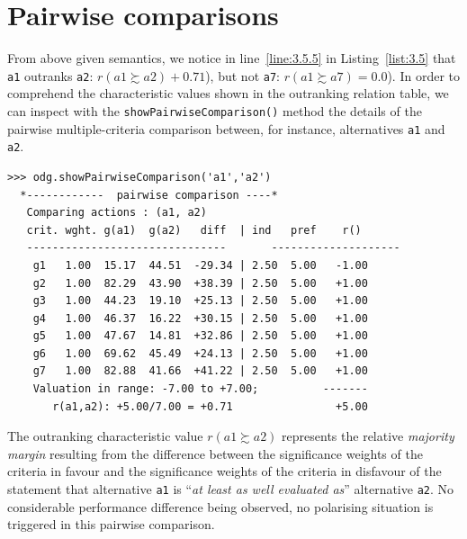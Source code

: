 \section{Pairwise comparisons}
\label{sec:3.3}

From above given semantics, we notice in line~\ref{line:3.5.5} in Listing~\vref{list:3.5} that \texttt{a1} outranks \texttt{a2}: $r(a1 \succsim a2) + 0.71$), but not \texttt{a7}: $r(a1 \succsim a7) = 0.0$). In order to comprehend the characteristic values shown in the outranking relation table, we can inspect with the \texttt{showPairwiseComparison()} method the details of the pairwise multiple-criteria comparison between, for instance, alternatives \texttt{a1} and \texttt{a2}.
\begin{lstlisting}[caption={Inspecting a pairwise multiple-criteria comparison},label=list:3.6]
>>> odg.showPairwiseComparison('a1','a2')
  *------------  pairwise comparison ----*
   Comparing actions : (a1, a2)
   crit. wght. g(a1)  g(a2)   diff  | ind   pref    r() 
   -------------------------------  	 --------------------
    g1   1.00  15.17  44.51  -29.34 | 2.50  5.00   -1.00 
    g2   1.00  82.29  43.90  +38.39 | 2.50  5.00   +1.00 
    g3   1.00  44.23  19.10  +25.13 | 2.50  5.00   +1.00 
    g4   1.00  46.37  16.22  +30.15 | 2.50  5.00   +1.00 
    g5   1.00  47.67  14.81  +32.86 | 2.50  5.00   +1.00 
    g6   1.00  69.62  45.49  +24.13 | 2.50  5.00   +1.00 
    g7   1.00  82.88  41.66  +41.22 | 2.50  5.00   +1.00 
    Valuation in range: -7.00 to +7.00;          -------
       r(a1,a2): +5.00/7.00 = +0.71                +5.00
\end{lstlisting}

The outranking characteristic value $r(a1 \succsim a2)$ represents the relative \emph{majority margin} resulting from the difference between the significance weights of the criteria in favour and the significance weights of the criteria in disfavour of the statement that alternative \texttt{a1} is ``\emph{at least as well evaluated as}'' alternative \texttt{a2}. No considerable performance difference being observed, no polarising situation is triggered in this pairwise comparison.

